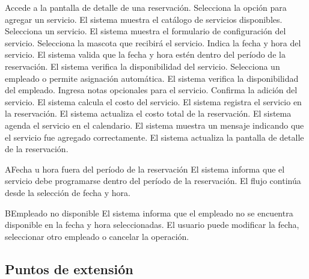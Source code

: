 \begin{UCtrayectoria}
	\UCpaso[\UCactor] Accede a la pantalla de detalle de una reservación.
	\UCpaso[\UCactor] Selecciona la opción para agregar un servicio.
	\UCpaso El sistema muestra el catálogo de servicios disponibles.
	\UCpaso[\UCactor] Selecciona un servicio.
	\UCpaso El sistema muestra el formulario de configuración del servicio.
	\UCpaso[\UCactor] Selecciona la mascota que recibirá el servicio.
	\UCpaso[\UCactor] Indica la fecha y hora del servicio.
	\UCpaso El sistema valida que la fecha y hora estén dentro del período de la reservación.
	\UCpaso El sistema verifica la disponibilidad del servicio.
	\UCpaso[\UCactor] Selecciona un empleado o permite asignación automática.
	\UCpaso El sistema verifica la disponibilidad del empleado.
	\UCpaso[\UCactor] Ingresa notas opcionales para el servicio.
	\UCpaso[\UCactor] Confirma la adición del servicio.
	\UCpaso El sistema calcula el costo del servicio.
	\UCpaso El sistema registra el servicio en la reservación.
	\UCpaso El sistema actualiza el costo total de la reservación.
	\UCpaso El sistema agenda el servicio en el calendario.
	\UCpaso El sistema muestra un mensaje indicando que el servicio fue agregado correctamente.
	\UCpaso El sistema actualiza la pantalla de detalle de la reservación.
\end{UCtrayectoria}

\begin{UCtrayectoriaA}{A}{Fecha u hora fuera del período de la reservación}
	\UCpaso El sistema informa que el servicio debe programarse dentro del período de la reservación.
	\UCpaso El flujo continúa desde la selección de fecha y hora.
\end{UCtrayectoriaA}

\begin{UCtrayectoriaA}{B}{Empleado no disponible}
	\UCpaso El sistema informa que el empleado no se encuentra disponible en la fecha y hora seleccionadas.
	\UCpaso El usuario puede modificar la fecha, seleccionar otro empleado o cancelar la operación.
\end{UCtrayectoriaA}

\subsection{Puntos de extensión}

